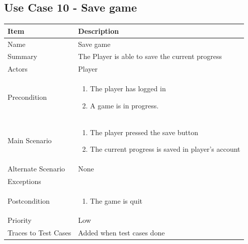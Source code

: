 \documentclass[12pt]{article}
\begin{document}
\newpage


\subsection{Use Case 10 - Save game}

\begin{center}
\setlength{\tabcolsep}{18pt}
\renewcommand{\arraystretch}{1.3}
\begin{tabular}{ |p{3.4cm}|p{10cm}| }
    \hline
    \textbf{Item} & \textbf{Description}\\
    \hline
    Name & Save game \\
    \hline
    Summary & The Player is able to save the current progress \\
    \hline
    Actors & Player \\
    \hline
    Precondition & 
    \vspace*{-0.1in}
    \begin{enumerate}
        \item The player has logged in
        \item A game is in progress.
        
    \end{enumerate}  \\
    \hline
    Main Scenario &     
    \vspace*{-0.1in}
    \begin{enumerate}
        \item The player pressed the save button
        \item The current progress is saved in player's account
    \end{enumerate}  \\
    \hline
    Alternate Scenario & None \\
    \hline
    Exceptions &  \\
    \hline
    Postcondition &
    \vspace*{-0.1in}
    \begin{enumerate}
        \item The game is quit
    \end{enumerate}  \\
    \hline
    Priority & Low \\
    \hline
    Traces to Test Cases & Added when test cases done  \\
    \hline
\end{tabular}
\end{center}
\end{document}
